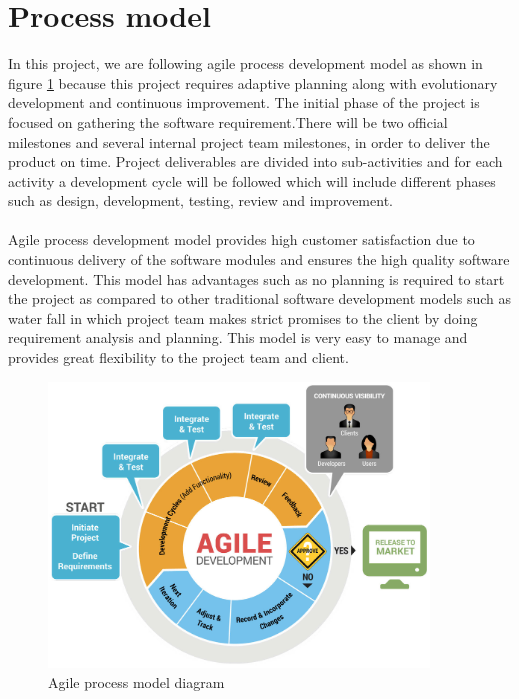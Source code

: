 \documentclass[a4paper]{article}
\begin{document}
\section{Process model}

In this project, we are following agile process development model as shown in figure \ref{fig:process_model} because this project requires adaptive planning along with evolutionary development and continuous improvement. The initial phase of the project is focused on gathering the software requirement.There will be two official milestones and several internal project team milestones, in order to deliver the product on time. Project deliverables are divided into sub-activities and for each activity a development cycle will be followed which will include different phases such as design, development, testing, review and improvement.
\paragraph{} Agile process development model provides high customer satisfaction due to continuous delivery of the software modules and ensures the high quality software development. This model has advantages such as no planning is required to start the project as compared to other traditional software development models such as water fall in which project team makes strict promises to the client by doing requirement analysis and planning. This model is very easy to manage and provides great flexibility to the project team and client.

\begin{figure}
\centering
\includegraphics[width=0.9\textwidth]{process_model.png}
\caption{\label{fig:process_model}Agile process model diagram}
\end{figure}
\end{document}
